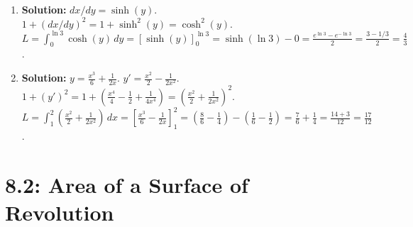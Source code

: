 \documentclass{article}
\begin{document}
\begin{enumerate}
    \item \textbf{Solution:} $dx/dy=\sinh(y)$. $1+(dx/dy)^2=1+\sinh^2(y)=\cosh^2(y)$.
    $L=\int_0^{\ln 3} \cosh(y) \,dy = [\sinh(y)]_0^{\ln 3} = \sinh(\ln 3) - 0 = \frac{e^{\ln 3}-e^{-\ln 3}}{2} = \frac{3-1/3}{2}=\frac{4}{3}$.
    
    \item \textbf{Solution:} $y=\frac{x^3}{6}+\frac{1}{2x}$. $y'=\frac{x^2}{2}-\frac{1}{2x^2}$. $1+(y')^2=1+(\frac{x^4}{4}-\frac{1}{2}+\frac{1}{4x^4})=(\frac{x^2}{2}+\frac{1}{2x^2})^2$.
    $L=\int_1^2(\frac{x^2}{2}+\frac{1}{2x^2})\,dx=[\frac{x^3}{6}-\frac{1}{2x}]_1^2=(\frac{8}{6}-\frac{1}{4})-(\frac{1}{6}-\frac{1}{2})=\frac{7}{6}+\frac{1}{4}=\frac{14+3}{12}=\frac{17}{12}$.
\end{enumerate}

\part*{8.2: Area of a Surface of Revolution}
\end{document}
